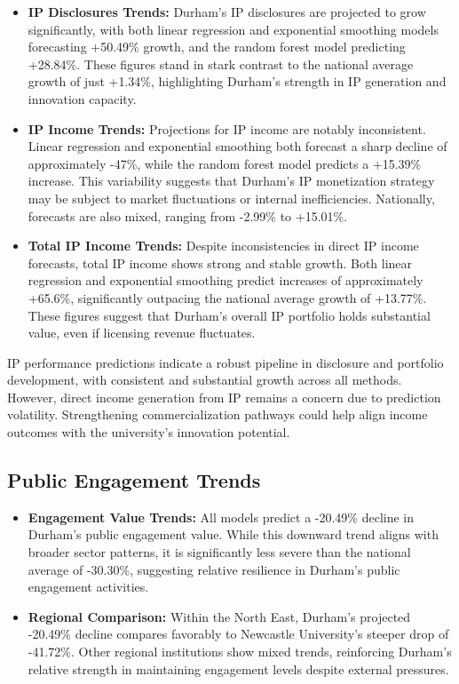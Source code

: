 \documentclass[journal,onecolumn, 10pt,draftclsnofoot]{IEEEtran}
\begin{document}
\begin{itemize}
    \item \textbf{IP Disclosures Trends:} Durham's IP disclosures are projected to grow significantly, with both linear regression and exponential smoothing models forecasting +50.49\% growth, and the random forest model predicting +28.84\%. These figures stand in stark contrast to the national average growth of just +1.34\%, highlighting Durham's strength in IP generation and innovation capacity.
    
    \item \textbf{IP Income Trends:} Projections for IP income are notably inconsistent. Linear regression and exponential smoothing both forecast a sharp decline of approximately -47\%, while the random forest model predicts a +15.39\% increase. This variability suggests that Durham's IP monetization strategy may be subject to market fluctuations or internal inefficiencies. Nationally, forecasts are also mixed, ranging from -2.99\% to +15.01\%.
    
    \item \textbf{Total IP Income Trends:} Despite inconsistencies in direct IP income forecasts, total IP income shows strong and stable growth. Both linear regression and exponential smoothing predict increases of approximately +65.6\%, significantly outpacing the national average growth of +13.77\%. These figures suggest that Durham's overall IP portfolio holds substantial value, even if licensing revenue fluctuates.
\end{itemize}

IP performance predictions indicate a robust pipeline in disclosure and portfolio development, with consistent and substantial growth across all methods. However, direct income generation from IP remains a concern due to prediction volatility. Strengthening commercialization pathways could help align income outcomes with the university's innovation potential.

\subsection{Public Engagement Trends}

\begin{itemize}
    \item \textbf{Engagement Value Trends:} All models predict a -20.49\% decline in Durham's public engagement value. While this downward trend aligns with broader sector patterns, it is significantly less severe than the national average of -30.30\%, suggesting relative resilience in Durham's public engagement activities.
    
    \item \textbf{Regional Comparison:} Within the North East, Durham's projected -20.49\% decline compares favorably to Newcastle University's steeper drop of -41.72\%. Other regional institutions show mixed trends, reinforcing Durham's relative strength in maintaining engagement levels despite external pressures.
\end{itemize}
\end{document}
